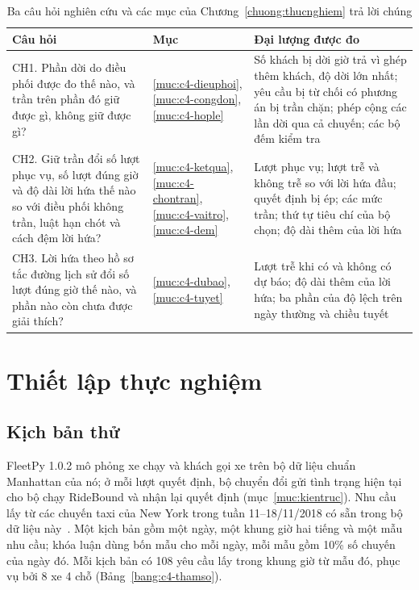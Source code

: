 \begin{table}[htbp]
\centering
\caption{Ba câu hỏi nghiên cứu và các mục của Chương~\ref{chuong:thucnghiem} trả lời chúng}
\label{bang:c4-lotrinh}
\small
\begin{tabular}{@{}p{6.3cm}p{2.4cm}p{6.3cm}@{}}
\toprule
\textbf{Câu hỏi} & \textbf{Mục} & \textbf{Đại lượng được đo}\\
\midrule
CH1. Phần dời do điều phối được đo thế nào, và trần trên phần đó giữ được gì, không giữ được gì?
& \ref{muc:c4-dieuphoi}, \ref{muc:c4-congdon}, \ref{muc:c4-hople}
& Số khách bị dời giờ trả vì ghép thêm khách, độ dời lớn nhất; yêu cầu bị từ chối có phương án bị trần chặn;
phép cộng các lần dời qua cả chuyến; các bộ đếm kiểm tra\\
CH2. Giữ trần đổi số lượt phục vụ, số lượt đúng giờ và độ dài lời hứa thế nào so với điều phối không
trần, luật hạn chót và cách đệm lời hứa?
& \ref{muc:c4-ketqua}, \ref{muc:c4-chontran}, \ref{muc:c4-vaitro}, \ref{muc:c4-dem}
& Lượt phục vụ; lượt trễ và không trễ so với lời hứa đầu; quyết định bị ép; các mức trần; thứ tự tiêu chí
của bộ chọn; độ dài thêm của lời hứa\\
CH3. Lời hứa theo hồ sơ tắc đường lịch sử đổi số lượt đúng giờ thế nào, và phần nào còn chưa được
giải thích?
& \ref{muc:c4-dubao}, \ref{muc:c4-tuyet}
& Lượt trễ khi có và không có dự báo; độ dài thêm của lời hứa; ba phần của độ lệch trên ngày thường và chiều
tuyết\\
\bottomrule
\end{tabular}
\end{table}

\section{Thiết lập thực nghiệm}
\label{muc:c4-thietlap}

\subsection{Kịch bản thử}
\label{muc:c4-kichban}

FleetPy 1.0.2 mô phỏng xe chạy và khách gọi xe trên bộ dữ liệu chuẩn Manhattan của nó; ở mỗi lượt quyết định, bộ
chuyển đổi gửi tình trạng hiện tại cho bộ chạy RideBound và nhận lại quyết định (mục~\ref{muc:kientruc}). Nhu cầu
lấy từ các chuyến taxi của New York trong tuần 11--18/11/2018 có sẵn trong bộ dữ liệu này~\cite{engelhardt2026}.
Một kịch bản gồm một ngày, một khung giờ hai tiếng và một mẫu nhu cầu; khóa luận dùng bốn mẫu cho mỗi ngày, mỗi mẫu
gồm 10\% số chuyến của ngày đó. Mỗi kịch bản có 108 yêu cầu lấy trong khung giờ từ mẫu đó, phục vụ bởi 8 xe 4 chỗ
(Bảng~\ref{bang:c4-thamso}).

